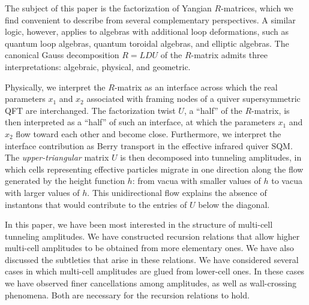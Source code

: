 \documentclass[10pt]{article}
\theoremstyle{definition}
\numberwithin{equation}{section}
\begin{document}
The subject of this paper is the factorization of Yangian $R$-matrices, which we find convenient to describe from several complementary perspectives.
A similar logic, however, applies to algebras with additional loop deformations, such as quantum loop algebras, quantum toroidal algebras, and elliptic algebras.
The canonical Gauss decomposition $R=LDU$ of the $R$-matrix admits three interpretations: algebraic, physical, and geometric.

Physically, we interpret the $R$-matrix as an interface across which the real parameters $x_1$ and $x_2$ associated with framing nodes of a quiver supersymmetric QFT are interchanged.
The factorization twist $U$, a ``half'' of the $R$-matrix, is then interpreted as a ``half'' of such an interface, at which the parameters $x_1$ and $x_2$ flow toward each other and become close.
Furthermore, we interpret the interface contribution as Berry transport in the effective infrared quiver SQM.
The \emph{upper-triangular} matrix $U$ is then decomposed into tunneling amplitudes, in which cells representing effective particles migrate in one direction along the flow generated by the height function $h$: from vacua with smaller values of $h$ to vacua with larger values of $h$.
This unidirectional flow explains the absence of instantons that would contribute to the entries of $U$ below the diagonal.

In this paper, we have been most interested in the structure of multi-cell tunneling amplitudes.
We have constructed recursion relations that allow higher multi-cell amplitudes to be obtained from more elementary ones.
We have also discussed the subtleties that arise in these relations.
We have considered several cases in which multi-cell amplitudes are glued from lower-cell ones.
In these cases we have observed finer cancellations among amplitudes, as well as wall-crossing phenomena.
Both are necessary for the recursion relations to hold.
\end{document}
